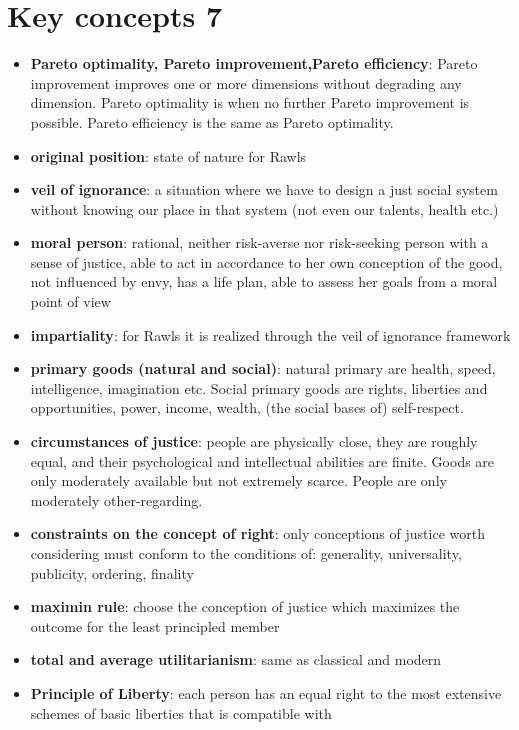 \section{Key concepts 7}
\begin{itemize}
	\item \textbf{Pareto optimality, Pareto improvement,Pareto efficiency}:
	 Pareto improvement improves one or more dimensions without degrading
	 any dimension. Pareto optimality is when no further Pareto improvement
	 is possible. Pareto efficiency is the same as Pareto optimality.
	\item \textbf{original position}: state of nature for Rawls
	\item \textbf{veil of ignorance}: a situation where we have to design
	 a just social system without knowing our place in that system (not
	 even our talents, health etc.)
	\item \textbf{moral person}: rational, neither risk-averse nor
	 risk-seeking person with a sense of justice, able to act in accordance
	 to her own conception of the good, not influenced by envy, has a life
	 plan, able to assess her goals from a moral point of view
	\item \textbf{impartiality}: for Rawls it is realized through the
	 veil of ignorance framework
	\item \textbf{primary goods (natural and social)}: natural primary
	 are health, speed, intelligence, imagination etc. Social primary goods
	 are rights, liberties and opportunities, power, income, wealth,
	 (the social bases of) self-respect.
	\item \textbf{circumstances of justice}: people are physically close,
	 they are roughly equal, and their psychological and intellectual
	 abilities are finite. Goods are only moderately available but not
	 extremely scarce. People are only moderately other-regarding.
	\item \textbf{constraints on the concept of right}: only conceptions
	 of justice worth considering must conform to the conditions of:
	 generality, universality, publicity, ordering, finality
	\item \textbf{maximin rule}: choose the conception of justice which
	 maximizes the outcome for the least principled member
	\item \textbf{total and average utilitarianism}: same as classical and
	 modern
	\item \textbf{Principle of Liberty}: each person has an equal right to
	 the most extensive schemes of basic liberties that is compatible with

\end{itemize}

